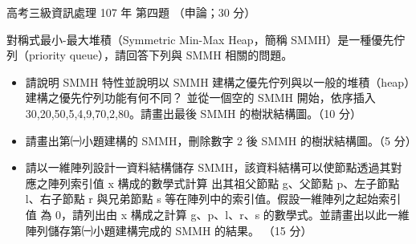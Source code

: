 \begin{pastexam}[label={px:gk3-107-ds-04}]{高考三級資訊處理 107 年 第四題}
（申論；30 分）

對稱式最小-最大堆積（Symmetric Min-Max Heap，簡稱 SMMH）是一種優先佇列（priority queue），請回答下列與 SMMH
相關的問題。
\begin{itemize}[leftmargin=2.2em]
\item[㈠] 請說明 SMMH 特性並說明以 SMMH 建構之優先佇列與以一般的堆積（heap）建構之優先佇列功能有何不同？
並從一個空的 SMMH 開始，依序插入 30,20,50,5,4,9,70,2,80。請畫出最後 SMMH 的樹狀結構圖。（10 分）
\item[㈡] 請畫出第㈠小題建構的 SMMH，刪除數字 2 後 SMMH 的樹狀結構圖。（5 分）
\item[㈢] 請以一維陣列設計一資料結構儲存 SMMH，該資料結構可以使節點透過其對應之陣列索引值 x 構成的數學式計算
出其祖父節點 g、父節點 p、左子節點 l、右子節點 r 與兄弟節點 s 等在陣列中的索引值。假設一維陣列之起始索引值
為 0，請列出由 x 構成之計算 g、p、l、r、s 的數學式。並請畫出以此一維陣列儲存第㈠小題建構完成的 SMMH 的結果。
（15 分）
\end{itemize}
\end{pastexam}

